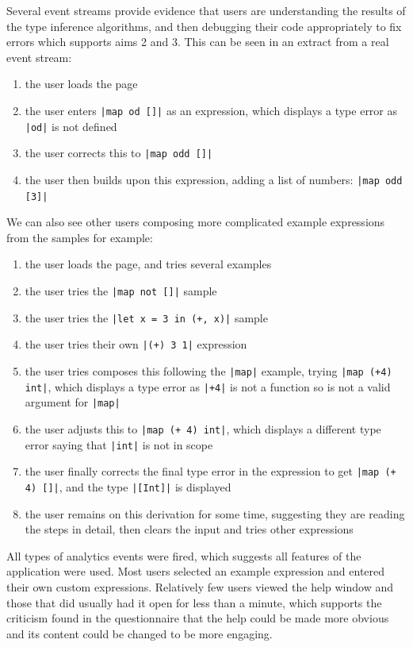 \documentclass[a4paper,fleqn,oneside,12pt]{report}
\begin{document}
Several event streams provide evidence that users are understanding the results of the type inference algorithms, and then debugging their code appropriately to fix errors which supports aims 2 and 3. This can be seen in an extract from a real event stream:
\begin{enumerate}
  \item the user loads the page
  \item the user enters \texttt{|map od []|} as an expression, which displays a type error as \texttt{|od|} is not defined
  \item the user corrects this to \texttt{|map odd []|}
  \item the user then builds upon this expression, adding a list of numbers: \texttt{|map odd [3]|}
\end{enumerate}

We can also see other users composing more complicated example expressions from the samples for example:
\begin{enumerate}
  \item the user loads the page, and tries several examples
  \item the user tries the \texttt{|map not []|} sample
  \item the user tries the \texttt{|let x = 3 in (+, x)|} sample
  \item the user tries their own \texttt{|(+) 3 1|} expression
  \item the user tries composes this following the \texttt{|map|} example, trying \texttt{|map (+4) int|}, which displays a type error as \texttt{|+4|} is not a function so is not a valid argument for \texttt{|map|}
  \item the user adjusts this to \texttt{|map (+ 4) int|}, which displays a different type error saying that \texttt{|int|} is not in scope
  \item the user finally corrects the final type error in the expression to get \texttt{|map (+ 4) []|}, and the type \texttt{|[Int]|} is displayed
  \item the user remains on this derivation for some time, suggesting they are reading the steps in detail, then clears the input and tries other expressions
\end{enumerate}

All types of analytics events were fired, which suggests all features of the application were used. Most users selected an example expression and entered their own custom expressions. Relatively few users viewed the help window and those that did usually had it open for less than a minute, which supports the criticism found in the questionnaire that the help could be made more obvious and its content could be changed to be more engaging.
\end{document}
